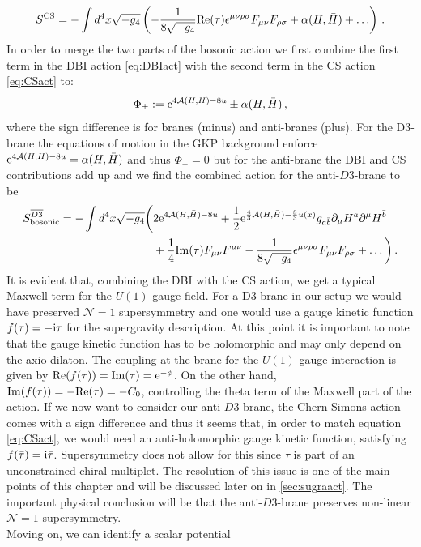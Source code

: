 \documentclass[a4paper,12pt]{report}
\newcommand{\be}{\begin{equation}}
\newcommand{\ee}{\end{equation}}
\newcommand{\bea}{\begin{equation}\begin{aligned}}
\newcommand{\eea}{\end{aligned}\end{equation}}
\def\rmi{{\rm i}}
\def\rme{{\rm e}}
\def\rmre{{\rm Re}}
\def\rmim{{\rm Im}}
\begin{document}
\be 
S^{\text{CS}}=-\int d^4x \sqrt{-g_4} \left(-\frac{1}{8 \sqrt{-g_4}}\rmre(\tau) \epsilon^{\mu \nu \rho \sigma} F_{\mu \nu} F_{\rho \sigma} + \alpha(H,\bar{H}) + \ldots \right)\,.
\label{eq:CSact}
\ee
In order to merge the two parts of the bosonic action we first combine the first term in the DBI action \eqref{eq:DBIact} with the second term in the CS action \eqref{eq:CSact} to:
\be 
\Phi_\pm := \rme^{4\mathcal{A}(H,\bar{H})-8u} \pm \alpha(H,\bar{H})\,,
\ee
where the sign difference is for branes (minus) and anti-branes (plus). For the D3-brane the equations of motion in the GKP background enforce  $\rme^{4\mathcal{A}(H,\bar{H})-8u} = \alpha(H,\bar{H})$ and thus $\Phi_-=0$ but for the anti-brane the DBI and CS contributions add up and we find the combined action for the anti-$D3$-brane to be
\bea 
S^{\overline{D3}}_{\text{bosonic}}= -\int d^4x \sqrt{-g_4} \bigg(&2 \rme^{4\mathcal{A}(H,\bar{H})-8u} + \frac{1}{2} \rme^{\frac{4}{3} \mathcal{A}(H,\bar{H})-\frac{8}{3} u(x)} g_{a\bar{b}} \partial_\mu H^a \partial^\mu \bar{H}^{\bar{b}} \\&+ \frac{1}{4} \rmim(\tau)F_{\mu\nu} F^{\mu \nu} - \frac{1}{8 \sqrt{-g_4}} \epsilon^{\mu \nu \rho \sigma} F_{\mu \nu} F_{\rho \sigma} + \ldots \bigg)\,.
\label{eq:simpbosact}
\eea 
It is evident that, combining the DBI with the CS action, we get a typical Maxwell term for the $U(1)$ gauge field.  For a D3-brane in our setup we would have preserved $\mathcal{N}=1$ supersymmetry and one would use a gauge kinetic function $f(\tau)=-\rmi \tau$ for the supergravity description. At this point it is important to note that the gauge kinetic function has to be holomorphic and may only depend on the axio-dilaton. The coupling at the brane for the $U(1)$ gauge interaction is given by $\rmre(f(\tau)) = \rmim(\tau) = \rme^{-\phi}$. On the other hand, $\rmim(f(\tau)) = - \rmre(\tau) = -C_0$, controlling the theta term of the Maxwell part of the action. If we now want to consider our anti-$D3$-brane, the Chern-Simons action comes with a sign difference and thus it seems that, in order to match equation \eqref{eq:CSact}, we would need an anti-holomorphic gauge kinetic function, satisfying $f(\bar{\tau})= \rmi \bar{\tau}$. Supersymmetry does not allow for this since $\tau$ is part of an unconstrained chiral multiplet. The resolution of this issue is one of the main points of this chapter and will be discussed later on in \ref{sec:sugraact}. The important physical conclusion will be that the anti-$D3$-brane preserves non-linear $\mathcal{N}=1$ supersymmetry.\\
Moving on, we can identify a scalar potential
\end{document}
